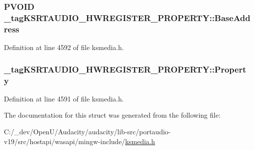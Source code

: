 \subsubsection[{\texorpdfstring{Base\+Address}{BaseAddress}}]{\setlength{\rightskip}{0pt plus 5cm}P\+V\+O\+ID \+\_\+tag\+K\+S\+R\+T\+A\+U\+D\+I\+O\+\_\+\+H\+W\+R\+E\+G\+I\+S\+T\+E\+R\+\_\+\+P\+R\+O\+P\+E\+R\+T\+Y\+::\+Base\+Address}\hypertarget{struct__tag_k_s_r_t_a_u_d_i_o___h_w_r_e_g_i_s_t_e_r___p_r_o_p_e_r_t_y_a081ac2f01b0a458e5e0de4c68d1946d8}{}\label{struct__tag_k_s_r_t_a_u_d_i_o___h_w_r_e_g_i_s_t_e_r___p_r_o_p_e_r_t_y_a081ac2f01b0a458e5e0de4c68d1946d8}


Definition at line 4592 of file ksmedia.\+h.

\subsubsection[{\texorpdfstring{Property}{Property}}]{ \+\_\+tag\+K\+S\+R\+T\+A\+U\+D\+I\+O\+\_\+\+H\+W\+R\+E\+G\+I\+S\+T\+E\+R\+\_\+\+P\+R\+O\+P\+E\+R\+T\+Y\+::\+Property}\hypertarget{struct__tag_k_s_r_t_a_u_d_i_o___h_w_r_e_g_i_s_t_e_r___p_r_o_p_e_r_t_y_af134b9234979a3547f1e6609991546ad}{}\label{struct__tag_k_s_r_t_a_u_d_i_o___h_w_r_e_g_i_s_t_e_r___p_r_o_p_e_r_t_y_af134b9234979a3547f1e6609991546ad}


Definition at line 4591 of file ksmedia.\+h.



The documentation for this struct was generated from the following file\+:\begin{DoxyCompactItemize}
\item 
C\+:/\+\_\+dev/\+Open\+U/\+Audacity/audacity/lib-\/src/portaudio-\/v19/src/hostapi/wasapi/mingw-\/include/\hyperlink{ksmedia_8h}{ksmedia.\+h}\end{DoxyCompactItemize}
